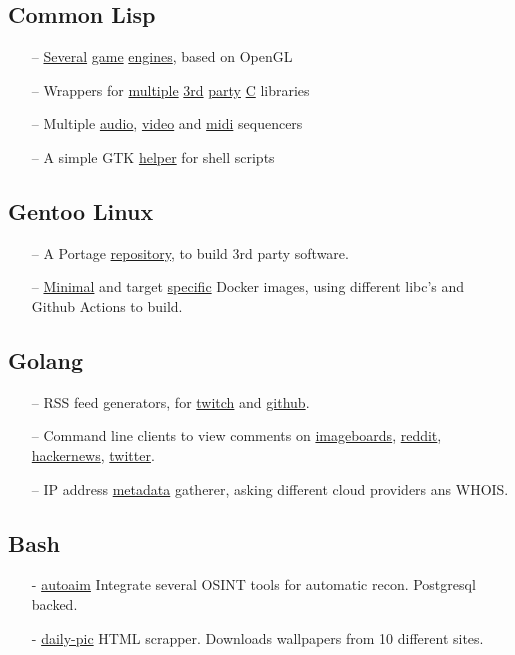 \documentclass[11pt]{article}
\newcommand{\git}[2]{\href {https://github.com/azimut/{#2}} {#1}}
\begin{document}
\subsection{Common Lisp}
\begin{itemize}
  \setlength{\parskip}{0pt}
  \setlength{\itemsep}{0pt plus 1pt}
  \item[--] \git{Several}{shiny} \git{game}{incandescent} \git{engines}{scenic}, based on OpenGL
  \item[--] Wrappers for \git{multiple}{cl-gme} \git{3rd}{espeak-ng} \git{party}{aubio} \git{C}{cloud} libraries
  \item[--] Multiple \git{audio}{meniere}, \git{video}{viseq} and \git{midi}{launchpad-csound} sequencers
  \item[--] A simple GTK \git{helper}{ipickme} for shell scripts
\end{itemize}

\subsection{Gentoo Linux}
\begin{itemize}
  \setlength{\parskip}{0pt}
  \setlength{\itemsep}{0pt plus 1pt}
  \item[--] A Portage \git{repository}{overlay}, to build 3rd party software.
  \item[--] \git{Minimal}{kubler-dock} and target \git{specific}{gantoo} Docker images, using different libc's and Github Actions to build.
\end{itemize}

\subsection{Golang}
\begin{itemize}
  \setlength{\parskip}{0pt}
  \setlength{\itemsep}{0pt plus 1pt}
  \item[--] RSS feed generators, for \git{twitch}{twitch-rss} and \git{github}{github-rss}.
  \item[--] Command line clients to view comments on
    \git{imageboards}{lainviewer},
    \git{reddit}{redditviewer},
    \git{hackernews}{cli-view},
    \git{twitter}{cli-view}.
  \item[--] IP address \git{metadata}{sunny} gatherer, asking different cloud providers ans WHOIS.
\end{itemize}

\subsection{Bash}
\begin{itemize}
  \setlength{\parskip}{0pt}
  \setlength{\itemsep}{0pt plus 1pt}
\item[-] {\git{autoaim}{autoaim}} Integrate several OSINT tools for automatic recon. Postgresql backed.
\item[-] {\git{daily-pic}{daily-pic}} HTML scrapper. Downloads wallpapers from 10 different sites.
\end{itemize}
\end{document}
